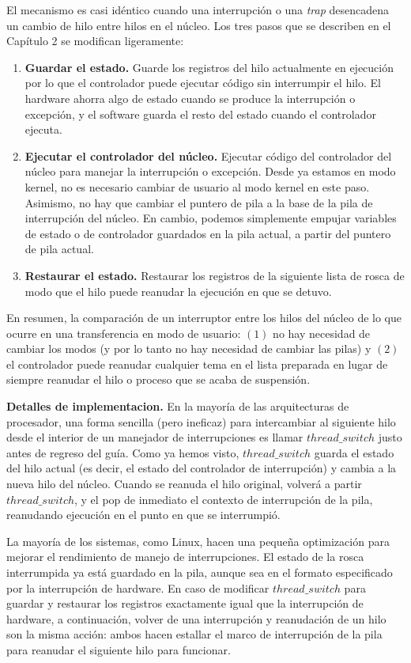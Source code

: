 \documentclass[10pt]{book}
\begin{document}
El mecanismo es casi idéntico cuando una interrupción o una \textit{trap} desencadena un cambio de hilo entre hilos en el núcleo. Los tres pasos que se describen en el Capítulo 2 se modifican ligeramente:
\begin{enumerate}
\item \textbf{Guardar el estado.} Guarde los registros del hilo actualmente en ejecución por lo que el controlador puede ejecutar código sin interrumpir el hilo. El hardware ahorra algo de estado cuando se produce la interrupción o excepción, y el software guarda el resto del estado cuando el controlador ejecuta.

\item \textbf{Ejecutar el controlador del núcleo.} Ejecutar código del controlador del núcleo para manejar la interrupción o excepción. Desde ya estamos en modo kernel, no es necesario cambiar de usuario al modo kernel en este paso. Asimismo, no hay que cambiar el puntero de pila a la base de la pila de interrupción del núcleo. En cambio, podemos simplemente empujar variables de estado o de controlador guardados en la pila actual, a partir del puntero de pila actual.

\item \textbf{Restaurar el estado.} Restaurar los registros de la siguiente lista de rosca de modo que el hilo puede reanudar la ejecución en que se detuvo.
\end{enumerate}

En resumen, la comparación de un interruptor entre los hilos del núcleo de lo que ocurre en una transferencia en modo de usuario: $(1)$ no hay necesidad de cambiar los modos (y por lo tanto no hay necesidad de cambiar las pilas) y $(2)$ el controlador puede reanudar cualquier tema en el lista preparada en lugar de siempre reanudar el hilo o proceso que se acaba de suspensión.

\textbf{Detalles de implementacion.} En la mayoría de las arquitecturas de procesador, una forma sencilla (pero ineficaz) para intercambiar al siguiente hilo desde el interior de un manejador de interrupciones es llamar $thread\_ switch$ justo antes de regreso del guía. Como ya hemos visto, $thread\_ switch$ guarda el estado del hilo actual (es decir, el estado del controlador de interrupción) y cambia a la nueva hilo del núcleo. Cuando se reanuda el hilo original, volverá a partir $thread\_ switch$, y el pop de inmediato el contexto de interrupción de la pila, reanudando ejecución en el punto en que se interrumpió.

La mayoría de los sistemas, como Linux, hacen una pequeña optimización para mejorar el rendimiento de manejo de interrupciones. El estado de la rosca interrumpida ya está guardado en la pila, aunque sea en el formato especificado por la interrupción de hardware. En caso de modificar $thread\_ switch$ para guardar y restaurar los registros exactamente igual que la interrupción de hardware, a continuación, volver de una interrupción y reanudación de un hilo son la misma acción: ambos hacen estallar el marco de interrupción de la pila para reanudar el siguiente hilo para funcionar.
\end{document}
